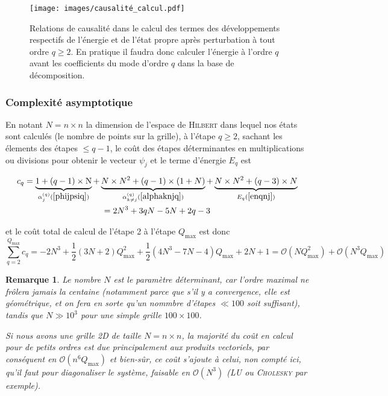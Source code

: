 \documentclass[svgnames,dvipsnames,a4paper,10pt,french]{report}
\newtheorem{remark}[theorem]{Remarque}
\begin{document}
\begin{figure}[H]
    \centering
    \texttt{[image: images/causalité\_calcul.pdf]}
    \caption[Causalité dans le calcul des termes des développements pour la \textit{sum over states}]{Relations de causalité dans le calcul des termes des développements respectifs de l'énergie et de l'état propre après perturbation à tout ordre $q\ge 2$. En pratique il faudra donc calculer l'énergie à l'ordre $q$ avant les coefficients du mode d'ordre $q$ dans la base de décomposition.}
    \label{fig:causalité}
\end{figure}



\subsubsection{Complexité asymptotique}
En notant $N=n\times n$ la dimension de l'espace de \textsc{Hilbert} dans lequel nos états sont calculés (le nombre de points sur la grille), à l'étape $q \ge 2$, sachant les élements des étapes $\le q-1$, le coût des étapes déterminantes en multiplications ou divisions pour obtenir le vecteur $\psi_j$ et le terme d'énergie $E_q$ est 

\begin{multline}
    c_q = \underbrace{1+(q-1) \times \mathrm{N} }_{\alpha_j^{(q) }(\ref{phijpsiq})} + \underbrace{N\times N^2 + (q-1)\times (1+ N)}_{\alpha_{k\neq j}^{(q)} (\ref{alphaknjq})} + \underbrace{N\times N^2+(q-3) \times N}_{E_q (\ref{enqnj})} \\
    = 2N^3 + 3qN - 5N + 2q - 3
\end{multline}

et le coût total de calcul de l'étape 2 à l'étape $Q_\text{max}$ est donc
\begin{equation}
    \sum_{q=2}^{Q_\text{max}} c_q = -2N^3 + \frac{1}{2}(3N + 2)Q_\text{max}^2 + \frac{1}{2}(4N^3 - 7N - 4)Q_\text{max} + 2N + 1 = \boxed{\mathcal{O}(NQ_\text{max}^2) + \mathcal{O}(N^3 Q_\text{max})}
\end{equation}

\begin{remark}
Le nombre $N$ est le paramètre déterminant, car l'ordre maximal ne frôlera jamais la centaine (notamment parce que s'il y a convergence, elle est géométrique, et on fera en sorte qu'un nommbre d'étapes $\ll 100$ soit suffisant), tandis que $N \gg 10^3$ pour une simple grille $100\times 100$.


Si nous avons une grille 2D de taille $N=n\times n$, la majorité du coût en calcul pour de petits ordres  est due principalement aux produits vectoriels, par conséquent  en $\mathcal{O}(n^6Q_\text{max})$ et bien-sûr, ce coût s'ajoute à celui, non compté ici, qu'il faut pour diagonaliser le système, faisable en $\mathcal{O}(N^3)$ (LU ou \textsc{Cholesky} par exemple).
\end{remark}
\end{document}
